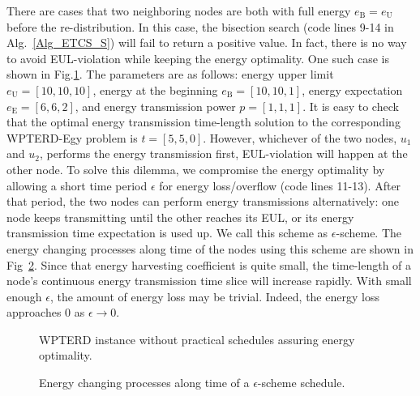 \documentclass[journal,10pt]{IEEEtran}
\begin{document}
There are cases that two neighboring nodes are both with full energy $e_\text{B}{=}e_\text{U}$ before the re-distribution. In this case, the bisection search (code lines 9-14 in Alg.~\ref{Alg_ETCS_S}) will fail to return a positive value. In fact, there is no way to avoid EUL-violation while keeping the energy optimality. One such case is shown in Fig.\ref{fig_full}. The parameters are as follows: energy upper limit $e_\text{U}{=}[10,10,10]$, energy at the beginning $e_\text{B}{=}[10,10,1]$, energy expectation $e_\text{E}{=}[6,6,2]$, and energy transmission power $p{=}[1,1,1]$. It is easy to check that the optimal energy transmission time-length solution to the corresponding WPTERD-Egy problem is $t{=}[5,5,0]$. However, whichever of the two nodes, $u_1$ and $u_2$, performs the energy transmission first, EUL-violation will happen at the other node. To solve this dilemma, we compromise the energy optimality by allowing a short time period $\epsilon$ for energy loss/overflow (code lines 11-13). After that period, the two nodes can perform energy transmissions alternatively: one node keeps transmitting until the other reaches its EUL, or its energy transmission time expectation is used up. We call this scheme as $\epsilon${-}scheme. The energy changing processes along time of the nodes using this scheme are shown in Fig~\ref{fig_full_sch}. Since that energy harvesting coefficient is quite small, the time-length of a node's continuous energy transmission time slice will increase rapidly. With small enough $\epsilon$, the amount of energy loss may be trivial. Indeed, the energy loss approaches 0 as $\epsilon{\rightarrow}0$.

\begin{figure}[htb]
\caption{WPTERD instance without practical schedules assuring energy optimality.}
\label{fig_full}
\end{figure}

\vspace{-4mm}
\begin{figure}[htb]
\caption{Energy changing processes along time of a $\epsilon${-}scheme schedule.}
\label{fig_full_sch}
\end{figure}
\end{document}

